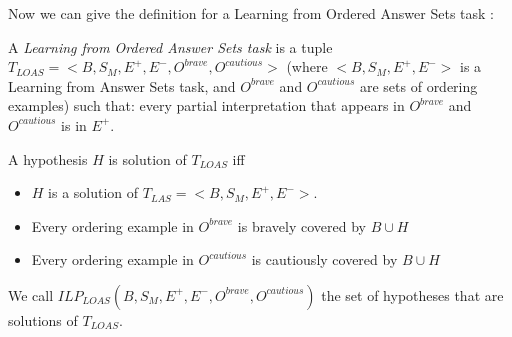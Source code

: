 Now we can give the definition for a Learning from Ordered Answer Sets task \citep{law2015weak}:

\begin{definition}
A \textit{Learning from Ordered Answer Sets task} is a tuple $T_{LOAS}=<B, S_M, E^+, E^-,O^{brave}, O^{cautious}>$ (where $<B,S_M, E^+, E^->$ is a Learning from Answer Sets task, and $O^{brave}$ and $O^{cautious}$ are sets of ordering examples) such that: every partial interpretation that appears in $O^{brave}$ and $O^{cautious}$ is in $E^+$.

\smallskip

A hypothesis $H$ is solution of $T_{LOAS}$ iff 
\begin{itemize}
\item $H$ is a solution of $T_{LAS}=<B, S_M, E^+, E^->$.
\item Every ordering example in $O^{brave}$ is bravely covered by $B\cup H$
\item Every ordering example in $O^{cautious}$ is cautiously covered by $B\cup H$
\end{itemize}

We call $ILP_{LOAS}(B,S_M,E^+,E^-,O^{brave},O^{cautious})$ the set of hypotheses that are solutions of $T_{LOAS}$.
\end{definition}

